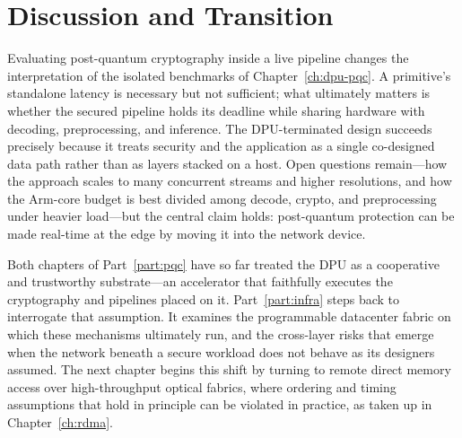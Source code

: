 
\section{Discussion and Transition}
\label{sec:edge-discussion}

Evaluating post-quantum cryptography inside a live pipeline changes the interpretation of the isolated benchmarks of Chapter~\ref{ch:dpu-pqc}. A primitive's standalone latency is necessary but not sufficient; what ultimately matters is whether the secured pipeline holds its deadline while sharing hardware with decoding, preprocessing, and inference. The DPU-terminated design succeeds precisely because it treats security and the application as a single co-designed data path rather than as layers stacked on a host. Open questions remain---how the approach scales to many concurrent streams and higher resolutions, and how the Arm-core budget is best divided among decode, crypto, and preprocessing under heavier load---but the central claim holds: post-quantum protection can be made real-time at the edge by moving it into the network device.

Both chapters of Part~\ref{part:pqc} have so far treated the DPU as a cooperative and trustworthy substrate---an accelerator that faithfully executes the cryptography and pipelines placed on it. Part~\ref{part:infra} steps back to interrogate that assumption. It examines the programmable datacenter fabric on which these mechanisms ultimately run, and the cross-layer risks that emerge when the network beneath a secure workload does not behave as its designers assumed. The next chapter begins this shift by turning to remote direct memory access over high-throughput optical fabrics, where ordering and timing assumptions that hold in principle can be violated in practice, as taken up in Chapter~\ref{ch:rdma}.
